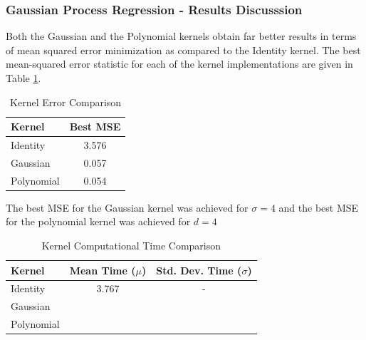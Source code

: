 \documentclass[parskip=full]{scrartcl}
\begin{document}
        \subsubsection*{Gaussian Process Regression - Results Discusssion} %
        \label{ssub:gaussian_process_regression_results_discusssion}

            Both the Gaussian and the Polynomial kernels obtain far better results in terms of mean squared error minimization as compared to the Identity kernel. The best mean-squared error statistic for each of the kernel implementations are given in Table \ref{tab:kernel_error_comparison}.

            \begin{table}[ht]
                \centering
                \begin{tabular}{| l | c |}
                \hline
                \textbf{Kernel} & \textbf{Best MSE} \\
                \hline
                \hline
                    Identity & 3.576 \\
                \hline
                    Gaussian & 0.057 \\
                \hline
                    Polynomial & 0.054 \\
                \hline
                \end{tabular}
                \caption{Kernel Error Comparison}
                \label{tab:kernel_error_comparison}
            \end{table}

            The best MSE for the Gaussian kernel was achieved for $\sigma = 4$ and the best MSE for the polynomial kernel was achieved for $d = 4$

            \begin{table}[ht]
                \centering
                \begin{tabular}{| l | c | c |}
                \hline
                \textbf{Kernel} & \textbf{Mean Time ($\mu$)} & \textbf{Std. Dev. Time ($\sigma$)} \\
                \hline
                \hline
                    Identity & 3.767 & - \\
                \hline
                    Gaussian &  & \\
                \hline
                    Polynomial &  & \\
                \hline
                \end{tabular}
                \caption{Kernel Computational Time Comparison}
                \label{tab:kernel_computational_time_comparison}
            \end{table}

        

    

\end{document}
